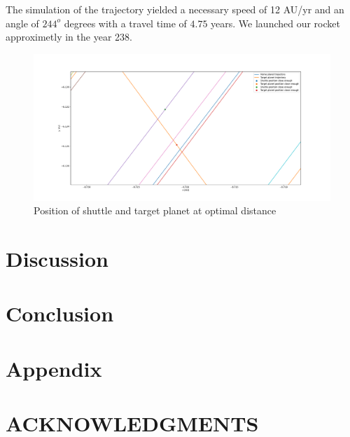 \documentclass[reprint,english,notitlepage]{revtex4-2}
\begin{document}
The simulation of the trajectory yielded a necessary speed of 12 AU/yr and an angle of $ 244 ^{o} $ degrees with a travel time of $ 4.75 $ years. We launched our rocket approximetly in the year 238.
\begin{figure}[h!]
  \centering
  \includegraphics[scale = .125]{Figures/good_enough_distance.pdf}
  \caption{Position of shuttle and target planet at optimal distance}
  \label{fig: good enough distance}
\end{figure} 

\section{Discussion} \label{sec: discussion}

\section{Conclusion} \label{sec: conclusion}

\section{Appendix} \label{sec: appendix}

\section*{ACKNOWLEDGMENTS}

\newpage
\end{document}
